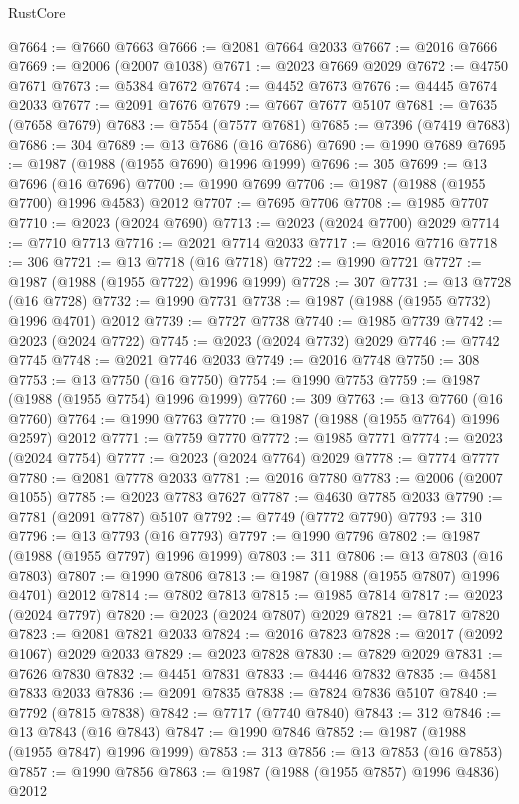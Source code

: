\begin{lexlean}{RustCore}
\begin{coremodule}
@7664 := @7660 @7663
@7666 := @2081 @7664 @2033
@7667 := @2016 @7666
@7669 := @2006 (@2007 @1038)
@7671 := @2023 @7669 @2029
@7672 := @4750 @7671
@7673 := @5384 @7672
@7674 := @4452 @7673
@7676 := @4445 @7674 @2033
@7677 := @2091 @7676
@7679 := @7667 @7677 @5107
@7681 := @7635 (@7658 @7679)
@7683 := @7554 (@7577 @7681)
@7685 := @7396 (@7419 @7683)
@7686 := 304
@7689 := @13 @7686 (@16 @7686)
@7690 := @1990 @7689
@7695 := @1987 (@1988 (@1955 @7690) @1996 @1999)
@7696 := 305
@7699 := @13 @7696 (@16 @7696)
@7700 := @1990 @7699
@7706 := @1987 (@1988 (@1955 @7700) @1996 @4583) @2012
@7707 := @7695 @7706
@7708 := @1985 @7707
@7710 := @2023 (@2024 @7690)
@7713 := @2023 (@2024 @7700) @2029
@7714 := @7710 @7713
@7716 := @2021 @7714 @2033
@7717 := @2016 @7716
@7718 := 306
@7721 := @13 @7718 (@16 @7718)
@7722 := @1990 @7721
@7727 := @1987 (@1988 (@1955 @7722) @1996 @1999)
@7728 := 307
@7731 := @13 @7728 (@16 @7728)
@7732 := @1990 @7731
@7738 := @1987 (@1988 (@1955 @7732) @1996 @4701) @2012
@7739 := @7727 @7738
@7740 := @1985 @7739
@7742 := @2023 (@2024 @7722)
@7745 := @2023 (@2024 @7732) @2029
@7746 := @7742 @7745
@7748 := @2021 @7746 @2033
@7749 := @2016 @7748
@7750 := 308
@7753 := @13 @7750 (@16 @7750)
@7754 := @1990 @7753
@7759 := @1987 (@1988 (@1955 @7754) @1996 @1999)
@7760 := 309
@7763 := @13 @7760 (@16 @7760)
@7764 := @1990 @7763
@7770 := @1987 (@1988 (@1955 @7764) @1996 @2597) @2012
@7771 := @7759 @7770
@7772 := @1985 @7771
@7774 := @2023 (@2024 @7754)
@7777 := @2023 (@2024 @7764) @2029
@7778 := @7774 @7777
@7780 := @2081 @7778 @2033
@7781 := @2016 @7780
@7783 := @2006 (@2007 @1055)
@7785 := @2023 @7783 @7627
@7787 := @4630 @7785 @2033
@7790 := @7781 (@2091 @7787) @5107
@7792 := @7749 (@7772 @7790)
@7793 := 310
@7796 := @13 @7793 (@16 @7793)
@7797 := @1990 @7796
@7802 := @1987 (@1988 (@1955 @7797) @1996 @1999)
@7803 := 311
@7806 := @13 @7803 (@16 @7803)
@7807 := @1990 @7806
@7813 := @1987 (@1988 (@1955 @7807) @1996 @4701) @2012
@7814 := @7802 @7813
@7815 := @1985 @7814
@7817 := @2023 (@2024 @7797)
@7820 := @2023 (@2024 @7807) @2029
@7821 := @7817 @7820
@7823 := @2081 @7821 @2033
@7824 := @2016 @7823
@7828 := @2017 (@2092 @1067) @2029 @2033
@7829 := @2023 @7828
@7830 := @7829 @2029
@7831 := @7626 @7830
@7832 := @4451 @7831
@7833 := @4446 @7832
@7835 := @4581 @7833 @2033
@7836 := @2091 @7835
@7838 := @7824 @7836 @5107
@7840 := @7792 (@7815 @7838)
@7842 := @7717 (@7740 @7840)
@7843 := 312
@7846 := @13 @7843 (@16 @7843)
@7847 := @1990 @7846
@7852 := @1987 (@1988 (@1955 @7847) @1996 @1999)
@7853 := 313
@7856 := @13 @7853 (@16 @7853)
@7857 := @1990 @7856
@7863 := @1987 (@1988 (@1955 @7857) @1996 @4836) @2012

\end{coremodule}
\end{lexlean}
